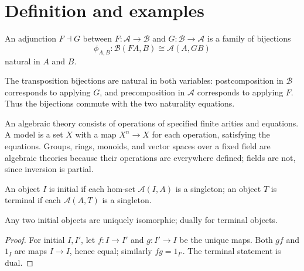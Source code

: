 \section{Definition and examples}
\begin{definition}[Adjunction]
\label{def:lbc-adjunction}
An adjunction $F\dashv G$ between $F:\mathcal A\to\mathcal B$ and
$G:\mathcal B\to\mathcal A$ is a family of bijections
\[\phi_{A,B}:\mathcal B(F A,B)\cong\mathcal A(A,G B)\]
natural in $A$ and $B$.
\end{definition}

\begin{remark}
\label{rem:lbc-adjunction-naturality}
The transposition bijections are natural in both variables: postcomposition in
$\mathcal B$ corresponds to applying $G$, and precomposition in $\mathcal A$
corresponds to applying $F$. Thus the bijections commute with the two
naturality equations.
\end{remark}

\begin{remark}
\label{rem:lbc-algebraic-theory}
An algebraic theory consists of operations of specified finite arities and
equations. A model is a set $X$ with a map $X^n\to X$ for each operation,
satisfying the equations. Groups, rings, monoids, and vector spaces over a
fixed field are algebraic theories because their operations are everywhere
defined; fields are not, since inversion is partial.
\end{remark}

\begin{definition}
\label{def:lbc-initial-terminal}
An object $I$ is initial if each hom-set $\mathcal A(I,A)$ is a singleton; an
object $T$ is terminal if each $\mathcal A(A,T)$ is a singleton.
\end{definition}

\begin{lemma}
\label{lem:lbc-initial-unique}
Any two initial objects are uniquely isomorphic; dually for terminal objects.
\end{lemma}
\begin{proof}
For initial $I,I'$, let $f:I\to I'$ and $g:I'\to I$ be the unique maps. Both
$gf$ and $1_I$ are maps $I\to I$, hence equal; similarly $fg=1_{I'}$.
The terminal statement is dual.
\end{proof}

